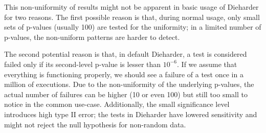 \documentclass[
  digital,  	%
  color,		%
  oneside,   	%
  12pt,
  nocover,
  notable,
  nolof,
  nolot,
]{fithesis3}
\theoremstyle{definition}
\theoremstyle{remark}
\begin{document}
This non-uniformity of results might not be apparent in basic usage of Dieharder for two reasons. The first possible reason is that, during normal usage, only small sets of p-values (usually 100) are tested for the uniformity; in a limited number of p-values, the non-uniform patterns are harder to detect. 

The second potential reason is that, in default Dieharder, a test is considered failed only if its second-level p-value is lesser than $10^{-6}$. If we assume that everything is functioning properly, we should see a failure of a test once in a million of executions. Due to the non-uniformity of the underlying p-values, the actual number of failures can be higher (10 or even 100) but still too small to notice in the common use-case. Additionally, the small significance level introduces high type II error; the tests in Dieharder have lowered sensitivity and might not reject the null hypothesis for non-random data.
\end{document}
